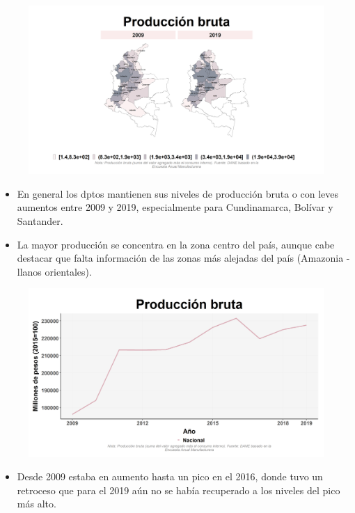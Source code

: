     \begin{figure}[H]
        \caption[Producción bruta por departamentos (mapa) - 2009 VS 2019 ]{\label{prod_bruta_dptos_mapa} }
        \begin{center}
        \includegraphics[width=\textwidth,keepaspectratio]{img/var_223_map.png}
        \end{center}
    \end{figure}
            \begin{itemize}
                    \item En general los dptos mantienen sus niveles de producción bruta o con leves aumentos entre 2009 y 2019, especialmente para Cundinamarca, Bolívar y Santander.
                    \item La mayor producción se concentra en la zona centro del país, aunque cabe destacar que falta información de las zonas más alejadas del país (Amazonia - llanos orientales).
                    \end{itemize}

    \begin{figure}[H]
        \caption[Producción bruta a nivel nacional ]{\label{prod_bruta_nacional} }
        \begin{center}
        \includegraphics[width=\textwidth,keepaspectratio]{img/var_224_trend.png}
        \end{center}
    \end{figure}
            \begin{itemize}
                    \item Desde 2009 estaba en aumento hasta un pico en el 2016, donde tuvo un retroceso que para el 2019 aún no se había recuperado a los niveles del pico más alto.
                    \end{itemize}

